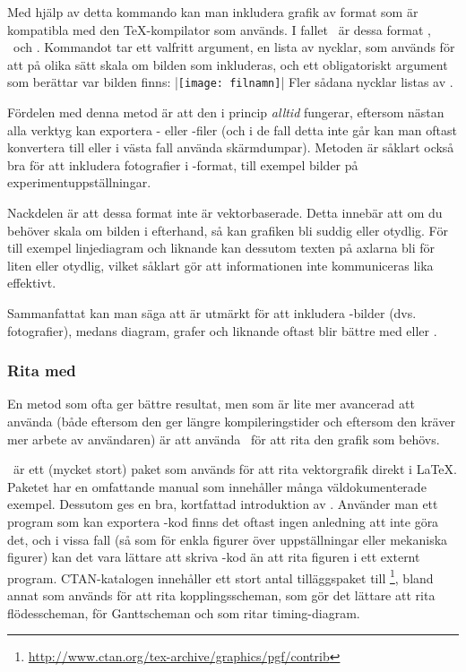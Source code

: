 \documentclass[10pt,../../a4.tex]{subfiles}
\begin{document}
Med hjälp av detta kommando kan man inkludera grafik av format som är
kompatibla med den \TeX-kompilator som används. I fallet \pdfLaTeX\ är
dessa format \PNG, \PDF\ och \JPEG. Kommandot tar ett valfritt
argument, en lista av nycklar, som används för att på olika sätt
skala om bilden som inkluderas, och ett obligatoriskt argument som
berättar var bilden finns:
\latex|\texttt{[image: filnamn]}|
Fler sådana nycklar listas av \textcite[8\psq]{Carlisle05}.

Fördelen med denna metod är att den i princip \emph{alltid} fungerar,
eftersom nästan alla verktyg kan exportera \PNG- eller \PDF-filer (och
i de fall detta inte går kan man oftast konvertera till \PNG eller i
västa fall använda skärmdumpar). Metoden är såklart också bra för att
inkludera fotografier i \JPEG-format, till exempel bilder på
experimentuppställningar.

Nackdelen är att dessa format inte är vektorbaserade. Detta innebär att
om du behöver skala om bilden i efterhand, så kan grafiken bli suddig
eller otydlig. För till exempel linjediagram och liknande kan dessutom
texten på axlarna bli för liten eller otydlig, vilket såklart gör att
informationen inte kommuniceras lika effektivt. 

Sammanfattat kan man säga att  är utmärkt för att
inkludera \JPEG-bilder (dvs. fotografier), medans diagram, grafer och
liknande oftast blir bättre med \PGFTikZ eller .

\subsubsection{Rita med \PGFTikZ}
En metod som ofta ger bättre resultat, men som är lite mer avancerad att
använda (både eftersom den ger längre kompileringstider och eftersom den
kräver mer arbete av användaren) är att använda \PGFTikZ\ för att rita
den grafik som behövs.

\PGFTikZ\ är ett (mycket stort) paket som används för att rita
vektorgrafik direkt i \LaTeX. Paketet har en omfattande manual
\parencite{Tantau10} som innehåller många väldokumenterade exempel.
Dessutom ges en bra, kortfattad introduktion av \textcite{Mertz07}.
Använder man ett program som kan exportera \PGFTikZ-kod finns det oftast
ingen anledning att inte göra det, och i vissa fall (så som för enkla
figurer över uppställningar eller mekaniska figurer) kan det vara 
lättare att skriva \PGFTikZ-kod än att rita figuren i ett externt program.
CTAN-katalogen innehåller ett stort antal tilläggspaket till \PGFTikZ%
\footnote{\url{http://www.ctan.org/tex-archive/graphics/pgf/contrib}},
bland annat  \parencite{Redaelli12} som används
för att rita kopplingsscheman,  \parencite{Robson13}
som gör det lättare att rita flödesscheman, 
\parencite{Skala13} för Ganttscheman och 
\parencite{Scharrer11} som ritar timing-diagram.
\end{document}

